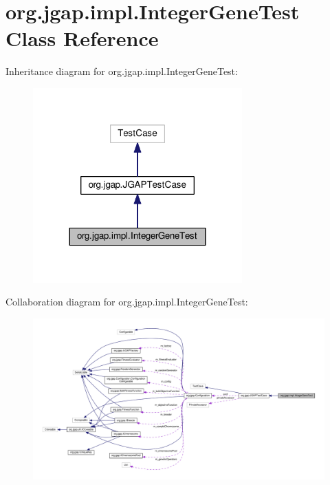 \hypertarget{classorg_1_1jgap_1_1impl_1_1_integer_gene_test}{\section{org.\-jgap.\-impl.\-Integer\-Gene\-Test Class Reference}
\label{classorg_1_1jgap_1_1impl_1_1_integer_gene_test}
}


Inheritance diagram for org.\-jgap.\-impl.\-Integer\-Gene\-Test\-:
\nopagebreak
\begin{figure}[H]
\begin{center}
\leavevmode
\includegraphics[width=228pt]{classorg_1_1jgap_1_1impl_1_1_integer_gene_test__inherit__graph}
\end{center}
\end{figure}


Collaboration diagram for org.\-jgap.\-impl.\-Integer\-Gene\-Test\-:
\nopagebreak
\begin{figure}[H]
\begin{center}
\leavevmode
\includegraphics[width=350pt]{classorg_1_1jgap_1_1impl_1_1_integer_gene_test__coll__graph}
\end{center}
\end{figure}
